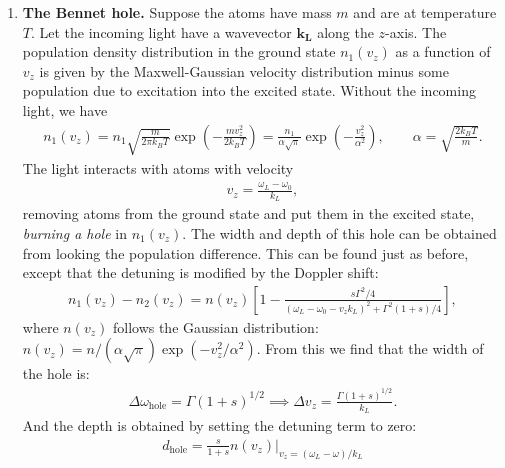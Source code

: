 \documentclass{article}
\theoremstyle{definition}
\newcommand{\al}{\alpha}
\newcommand{\f}[2]{\frac{#1}{#2}}
\newcommand{\lp}{\left(}
\newcommand{\rp}{\right)}
\newcommand{\lb}{\left[}
\newcommand{\rb}{\right]}
\begin{document}
\begin{enumerate}[label = (\alph*)]
	\item \textbf{The Bennet hole.} Suppose the atoms have mass $m$ and are at temperature $T$. Let the incoming light have a wavevector $\bm{k_L}$ along the $z$-axis. The population density distribution in the ground state $n_1(v_z)$ as a function of $v_z$ is given by the Maxwell-Gaussian velocity distribution minus some population due to excitation into the excited state. Without the incoming light, we have
	\begin{align*}
	n_1(v_z) = n_1\sqrt{\f{m}{2\pi k_BT}} \exp\lp -\f{m v_z^2}{2k_BT} \rp = \f{n_1}{\al\sqrt{\pi}} \exp\lp -\f{v_z^2}{\al^2} \rp, \quad\quad \al = \sqrt{\f{2k_BT}{m}}.
	\end{align*}
	The light interacts with atoms with velocity
	\begin{align*}
	v_z = \f{\omega_L - \omega_0}{k_L},
	\end{align*}
	removing atoms from the ground state and put them in the excited state, \textit{burning a hole} in $n_1(v_z)$. The width and depth of this hole can be obtained from looking the population difference. This can be found just as before, except that the detuning is modified by the Doppler shift:
	\begin{align*}
	n_1(v_z) - n_2(v_z) = n(v_z)\lb 1 - \f{s\Gamma^2/4}{(\omega_L - \omega_0 - v_z k_L)^2 + \Gamma^2(1+s)/4} \rb,
	\end{align*}
	where $n(v_z)$ follows the Gaussian distribution: $n(v_z) = n/(\al\sqrt{\pi}) \exp\lp -v_z^2/\al^2 \rp$. From this we find that the width of the hole is:
	\begin{align*}
	\Delta \omega_\text{hole} = \Gamma\lp 1 + s \rp^{1/2} \implies \Delta v_z = \f{\Gamma\lp 1 + s \rp^{1/2} }{k_L}.
	\end{align*}
	And the depth is obtained by setting the detuning term to zero:
	\begin{align*}
	d_\text{hole} = \f{s}{1+s} n(v_z) \bigg\vert_{v_z = (\omega_L - \omega)/k_L}
	\end{align*}
	
	
	

\end{enumerate}
\end{document}
